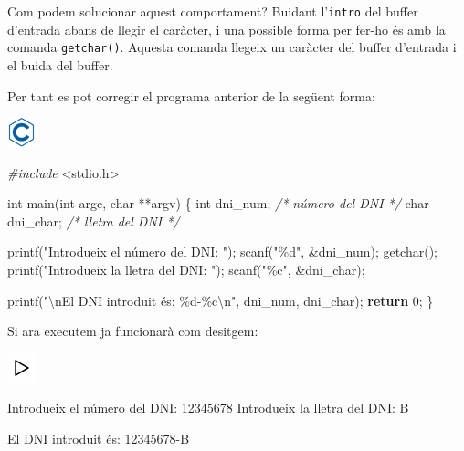\documentclass[
]{book}
\newenvironment{Shaded}{\begin{snugshade}}{\end{snugshade}}
\newcommand{\CommentTok}[1]{\textcolor[rgb]{0.56,0.35,0.01}{\textit{#1}}}
\newcommand{\ControlFlowTok}[1]{\textcolor[rgb]{0.13,0.29,0.53}{\textbf{#1}}}
\newcommand{\DataTypeTok}[1]{\textcolor[rgb]{0.13,0.29,0.53}{#1}}
\newcommand{\DecValTok}[1]{\textcolor[rgb]{0.00,0.00,0.81}{#1}}
\newcommand{\ImportTok}[1]{#1}
\newcommand{\NormalTok}[1]{#1}
\newcommand{\PreprocessorTok}[1]{\textcolor[rgb]{0.56,0.35,0.01}{\textit{#1}}}
\newcommand{\SpecialCharTok}[1]{\textcolor[rgb]{0.00,0.00,0.00}{#1}}
\newcommand{\StringTok}[1]{\textcolor[rgb]{0.31,0.60,0.02}{#1}}
\begin{document}
Com podem solucionar aquest comportament? Buidant l'\texttt{intro} del buffer d'entrada abans de llegir el caràcter, i una possible forma per fer-ho és amb la comanda \texttt{getchar()}. Aquesta comanda llegeix un caràcter del buffer d'entrada i el buida del buffer.

Per tant es pot corregir el programa anterior de la següent forma:

\includegraphics{./img/c.png}

\begin{Shaded}
\begin{Highlighting}[]
\PreprocessorTok{\#include }\ImportTok{\textless{}stdio.h\textgreater{}}

\DataTypeTok{int}\NormalTok{ main(}\DataTypeTok{int}\NormalTok{ argc, }\DataTypeTok{char}\NormalTok{ **argv) \{}
    \DataTypeTok{int}\NormalTok{ dni\_num;    }\CommentTok{/* número del DNI */}
    \DataTypeTok{char}\NormalTok{ dni\_char;  }\CommentTok{/* lletra del DNI */}

\NormalTok{    printf(}\StringTok{"Introdueix el número del DNI: "}\NormalTok{);}
\NormalTok{    scanf(}\StringTok{"\%d"}\NormalTok{, \&dni\_num);}
\NormalTok{    getchar();}
\NormalTok{    printf(}\StringTok{"Introdueix la lletra del DNI: "}\NormalTok{);}
\NormalTok{    scanf(}\StringTok{"\%c"}\NormalTok{, \&dni\_char);}

\NormalTok{    printf(}\StringTok{"}\SpecialCharTok{\textbackslash{}n}\StringTok{El DNI introduit és: \%d{-}\%c}\SpecialCharTok{\textbackslash{}n}\StringTok{"}\NormalTok{, dni\_num, dni\_char);}
    \ControlFlowTok{return} \DecValTok{0}\NormalTok{;}
\NormalTok{\}}
\end{Highlighting}
\end{Shaded}

Si ara executem ja funcionarà com desitgem:

\includegraphics{./img/play.png}

\begin{Shaded}
\begin{Highlighting}[]
\NormalTok{Introdueix el número del DNI: }\DecValTok{12345678}
\NormalTok{Introdueix la lletra del DNI: B}

\NormalTok{El DNI introduit és: }\DecValTok{12345678}\NormalTok{{-}B}
\end{Highlighting}
\end{Shaded}
\end{document}
